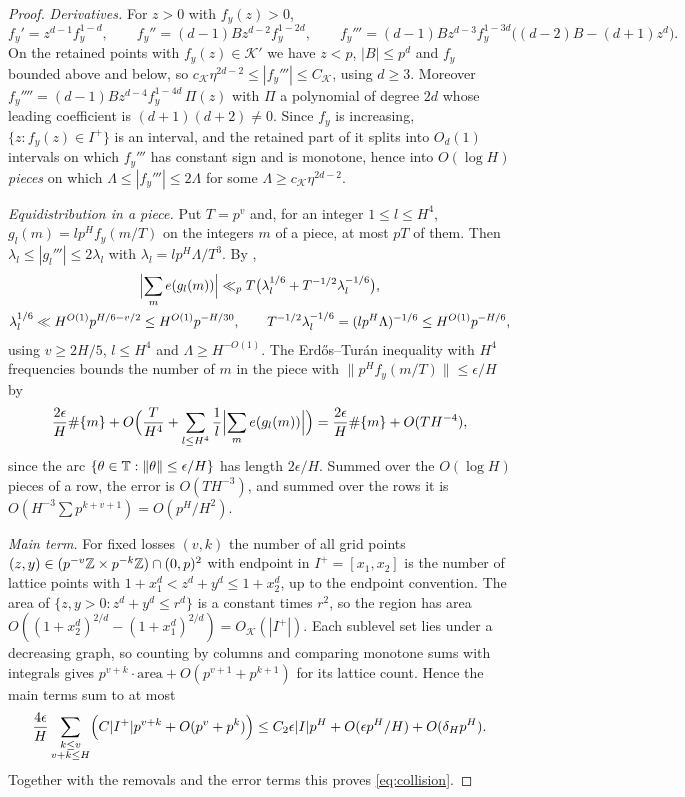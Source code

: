\documentclass[11pt]{article}
\newcommand{\dist}[1]{\lVert #1\rVert}
\begin{document}
\begin{proof}
\emph{Derivatives.} For $z>0$ with $f_y(z)>0$,
\[
f_y'=z^{d-1}f_y^{1-d},\qquad f_y''=(d-1)Bz^{d-2}f_y^{1-2d},\qquad
f_y'''=(d-1)Bz^{d-3}f_y^{1-3d}\bigl((d-2)B-(d+1)z^d\bigr).
\]
On the retained points with $f_y(z)\in\mathcal K'$ we have $z<p$, $|B|\le p^d$ and $f_y$ bounded above
and below, so $c_{\mathcal K}\eta^{2d-2}\le|f_y'''|\le C_{\mathcal K}$, using $d\ge3$. Moreover
$f_y''''=(d-1)Bz^{d-4}f_y^{1-4d}\,\Pi(z)$ with $\Pi$ a polynomial of degree $2d$ whose leading coefficient
is $(d+1)(d+2)\ne0$. Since $f_y$ is increasing, $\{z:f_y(z)\in I^+\}$ is an interval, and the retained
part of it splits into $O_d(1)$ intervals on which $f_y'''$ has constant sign and is monotone, hence into
$O(\log H)$ \emph{pieces} on which $\Lambda\le|f_y'''|\le2\Lambda$ for some $\Lambda\ge c_{\mathcal K}\eta^{2d-2}$.

\emph{Equidistribution in a piece.} Put $T=p^v$ and, for an integer $1\le l\le H^4$,
$g_l(m)=lp^Hf_y(m/T)$ on the integers $m$ of a piece, at most $pT$ of them. Then $\lambda_l\le|g_l'''|\le
2\lambda_l$ with $\lambda_l=lp^H\Lambda/T^3$. By ,
\begin{gather*}
\Bigl|\sum_me(g_l(m))\Bigr|\ll_pT\bigl(\lambda_l^{1/6}+T^{-1/2}\lambda_l^{-1/6}\bigr),\\
\lambda_l^{1/6}\ll H^{O(1)}p^{H/6-v/2}\le H^{O(1)}p^{-H/30},\qquad
T^{-1/2}\lambda_l^{-1/6}=(lp^H\Lambda)^{-1/6}\le H^{O(1)}p^{-H/6},
\end{gather*}
using $v\ge2H/5$, $l\le H^4$ and $\Lambda\ge H^{-O(1)}$. The Erdős--Turán inequality
\cite[Chapter~2, Theorem~2.5, p.~112]{KN} with $H^4$ frequencies bounds the number of $m$ in the piece
with $\dist{p^Hf_y(m/T)}\le\epsilon/H$ by
\[
\frac{2\epsilon}H\#\{m\}+O\Bigl(\frac{T}{H^4}+\sum_{l\le H^4}\frac1l\Bigl|\sum_me(g_l(m))\Bigr|\Bigr)
=\frac{2\epsilon}H\#\{m\}+O(TH^{-4}),
\]
since the arc $\{\theta\in\T:\dist\theta\le\epsilon/H\}$ has length $2\epsilon/H$. Summed over the
$O(\log H)$ pieces of a row, the error is $O(TH^{-3})$, and summed over the rows it is
$O(H^{-3}\sum p^{k+v+1})=O(p^H/H^2)$.

\emph{Main term.} For fixed losses $(v,k)$ the number of all grid points
$(z,y)\in(p^{-v}\mathbb Z\times p^{-k}\mathbb Z)\cap(0,p)^2$ with endpoint in $I^+=[x_1,x_2]$ is the number of lattice
points with $1+x_1^d<z^d+y^d\le1+x_2^d$, up to the endpoint convention. The area of
$\{z,y>0:z^d+y^d\le r^d\}$ is a constant times $r^2$, so the region has area
$O((1+x_2^d)^{2/d}-(1+x_1^d)^{2/d})=O_{\mathcal K}(|I^+|)$. Each sublevel set lies under a decreasing
graph, so counting by columns and comparing monotone sums with integrals gives
$p^{v+k}\cdot\mathrm{area}+O(p^{v+1}+p^{k+1})$ for its lattice count. Hence the main terms sum to at most
\[
\frac{4\epsilon}H\sum_{\substack{k\le v\\v+k\le H}}\Bigl(C|I^+|p^{v+k}+O(p^v+p^k)\Bigr)
\le C_2\epsilon|I|p^H+O(\epsilon p^H/H)+O(\delta_Hp^H).
\]
Together with the removals and the error terms this proves \eqref{eq:collision}.
\end{proof}
\end{document}
